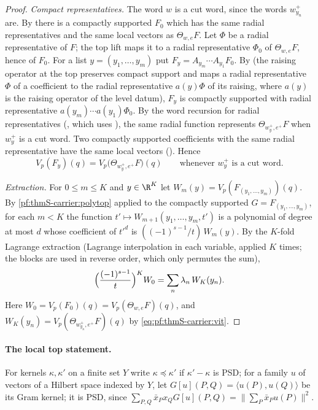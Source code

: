 \begin{proof}
\emph{Compact representatives.} The word $w$ is a cut word, since the words $w^+_{y_n}$ are. By
 there is a compactly supported $F_0$ which has the same radial
representatives and the same local vectors as $\Theta_{w,e}F$. Let $\Phi$ be a radial representative of $F$; the top lift
maps it to a radial representative $\Phi_0$ of $\Theta_{w,e}F$, hence of $F_0$. For a list $y=(y_1,\dots,y_m)$ put $F_y=A_{y_m}\cdots A_{y_1}F_0$.
By  (the raising operator at the top preserves compact support and
maps a radial representative $\Phi$ of a coefficient to the radial representative $a(y)\Phi$ of its raising, where $a(y)$ is
the raising operator of the level datum), $F_y$ is compactly supported with radial representative $a(y_m)\cdots a(y_1)\Phi_0$.
By the word recursion for radial representatives (, which uses
), the same radial function represents $\Theta_{w^+_y,e^+}F$ when $w^+_y$
is a cut word. Two compactly supported coefficients with the same radial representative have the same local vectors
(). Hence
\begin{equation}\label{eq:pf:thmS-carrier:vit}
V_p(F_y)(q)=V_p\bigl(\Theta_{w^+_y,e^+}F\bigr)(q)\qquad\text{whenever }w^+_y\text{ is a cut word}.
\end{equation}

\emph{Extraction.} For $0\le m\le K$ and $y\in\R^K$ let $W_m(y)=V_p(F_{(y_1,\dots,y_m)})(q)$. By \cref{pf:thmS-carrier:polytop}
applied to the compactly supported $G=F_{(y_1,\dots,y_m)}$, for each $m<K$ the function $t'\mapsto W_{m+1}(y_1,\dots,y_m,t')$ is
a polynomial of degree at most $d$ whose coefficient of $t'^d$ is $((-1)^{s-1}/t)\,W_m(y)$. By the $K$-fold Lagrange extraction
 (Lagrange interpolation in each variable, applied $K$ times; the blocks
are used in reverse order, which only permutes the sum),
\[
\Bigl(\frac{(-1)^{s-1}}{t}\Bigr)^KW_0=\sum_n\lambda_n\,W_K(y_n).
\]
Here $W_0=V_p(F_0)(q)=V_p(\Theta_{w,e}F)(q)$, and $W_K(y_n)=V_p(\Theta_{w^+_{y_n},e^+}F)(q)$ by \eqref{eq:pf:thmS-carrier:vit}.
\end{proof}

\paragraph{The local top statement.}
For kernels $\kappa,\kappa'$ on a finite set $Y$ write $\kappa\preceq\kappa'$ if $\kappa'-\kappa$ is PSD; for a family $u$ of
vectors of a Hilbert space indexed by $Y$, let $G[u](P,Q)=\langle u(P),u(Q)\rangle$ be its Gram kernel; it is PSD, since
$\sum_{P,Q}\bar x_Px_QG[u](P,Q)=\|\sum_P\bar x_Pu(P)\|^2$.

